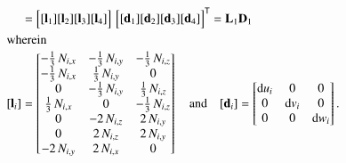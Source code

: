 \begin{subequations}
\begin{align}
	& = \begin{bmatrix}
	[\mathbf{l}_1] [\mathbf{l}_2] [\mathbf{l}_3] [\mathbf{l}_4] 
	\end{bmatrix}   \, \begin{bmatrix} [\mathbf{d}_1] [\mathbf{d}_2] [\mathbf{d}_3] [\mathbf{d}_4] \end{bmatrix}^{\mathsf{T}}
	= \mathbf{L}_1 \mathbf{D}_1 \\
	\intertext{wherein}
	[\mathbf{l}_i] & = \begin{bmatrix} 
	-\tfrac{1}{3} \, N_{i,x} &  - \tfrac{1}{3} \, N_{i,y} & -\tfrac{1}{3} \, N_{i,z} \\
	-\tfrac{1}{3} \, N_{i,x} &  \tfrac{1}{3} \, N_{i,y} & 0 \\
	0  & -\tfrac{1}{3} \, N_{i,y} & \tfrac{1}{3} \, N_{i,z} \\
	\tfrac{1}{3} \, N_{i,x} &  0 & - \tfrac{1}{3} \,  N_{i,z} \\
    0 &  - 2 \, N_{i,z}  &  2 \, N_{i,y} \\
    0 &  2 \, N_{i,z}  &  2 \, N_{i,y}  \\
	- 2 \,  N_{i,y} &  2 \, N_{i,x} & 0   \end{bmatrix}  \quad \text{and} \quad	[\mathbf{d}_i] = \begin{bmatrix}
	\mathrm{d} u_i & 0  & 0  \\
	0 &  \mathrm{d} v_i   & 0  \\
	0 & 0 & \mathrm{d} w_i \end{bmatrix} .
	\end{align}
\end{subequations}

